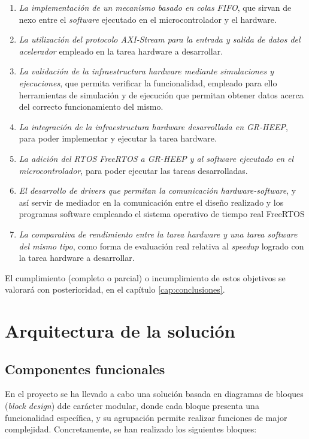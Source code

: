 \begin{enumerate}
    \item \emph{La implementación de un mecanismo basado en colas FIFO}, que sirvan de nexo entre el \textit{software} ejecutado en el microcontrolador y el hardware.
    \item \emph{La utilización del protocolo AXI-Stream para la entrada y salida de datos del acelerador} empleado en la tarea hardware a desarrollar.
    \item \emph{La validación de la infraestructura hardware mediante simulaciones y ejecuciones}, que permita verificar la funcionalidad, empleado para ello herramientas de simulación y de ejecución que permitan obtener datos acerca del correcto funcionamiento del mismo.
    \item \emph{La integración de la infraestructura hardware desarrollada en GR-HEEP}, para poder implementar y ejecutar la tarea hardware.
    \item \emph{La adición del RTOS FreeRTOS a GR-HEEP y al software ejecutado en el microcontrolador}, para poder ejecutar las tareas desarrolladas.
    \item \emph{El desarrollo de \textit{drivers} que permitan la comunicación hardware-software}, y así servir de mediador en la comunicación entre el diseño realizado y los programas software empleando el sistema operativo de tiempo real FreeRTOS
    \item \emph{La comparativa de rendimiento entre la tarea hardware y una tarea software del mismo tipo}, como forma de evaluación real relativa al \textit{speedup} logrado con la tarea hardware a desarrollar.
\end{enumerate}

El cumplimiento (completo o parcial) o incumplimiento de estos objetivos se valorará con posterioridad, en el capítulo \ref{cap:conclusiones}.

\section{Arquitectura de la solución}

\subsection{Componentes funcionales}
En el proyecto se ha llevado a cabo una solución basada en diagramas de bloques (\textit{block design}) dde carácter modular, donde cada bloque presenta una funcionalidad específica, y su agrupación permite realizar funciones de major complejidad. Concretamente, se han realizado los siguientes bloques:

